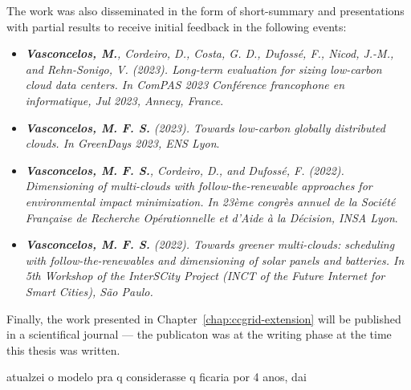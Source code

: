 The work was also disseminated in the form of short-summary and presentations with partial results to receive initial feedback in the following events:

\begin{itemize}

\item \textit{\textbf{Vasconcelos, M.}, Cordeiro, D., Costa, G. D., Dufossé, F., Nicod, J.-M., and Rehn-Sonigo, V. (2023). Long-term evaluation for sizing low-carbon cloud data centers. In ComPAS 2023 Conférence francophone en informatique, Jul 2023, Annecy, France}.

  \item  \textit{\textbf{Vasconcelos, M. F. S.} (2023). Towards low-carbon globally distributed clouds. In GreenDays 2023, ENS Lyon}.

\item  \textit{\textbf{Vasconcelos, M. F. S.}, Cordeiro, D., and Dufossé, F. (2022). Dimensioning of multi-clouds with follow-the-renewable approaches for environmental impact minimization. In 23ème congrès annuel de la Société Française de Recherche Opérationnelle et d’Aide à la Décision, INSA Lyon}.

\item  \textit{\textbf{Vasconcelos, M. F. S.} (2022). Towards greener multi-clouds: scheduling with follow-the-renewables and dimensioning of solar panels and batteries. In 5th Workshop of the InterSCity Project (INCT of the Future Internet for Smart Cities), São Paulo.}

\end{itemize}

Finally, the work presented in Chapter~\ref{chap:ccgrid-extension} will be published in a scientifical journal --- the publicaton was at the writing phase at the time this thesis was written.


atualzei o modelo pra q considerasse q ficaria por 4 anos, dai 

